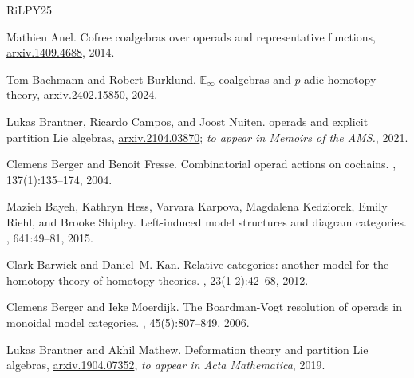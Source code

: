 \documentclass[a4paper,12pt]{amsart}
\theoremstyle{plain}
\theoremstyle{definition}
\theoremstyle{remark}
\begin{document}
\newcommand{\etalchar}[1]{$^{#1}$}
\def\cprime{$'$}
\begin{thebibliography}{RiLPY25}

Mathieu Anel.
\newblock Cofree coalgebras over operads and representative functions,
  \href{https://arxiv.org/abs/1409.4688}{arxiv.1409.4688}, 2014.

Tom Bachmann and Robert Burklund.
\newblock $\mathbb{E}_{\infty}$-coalgebras and $p$-adic homotopy theory,
  \href{https://arxiv.org/abs/2402.15850}{arxiv.2402.15850}, 2024.

Lukas Brantner, Ricardo Campos, and Joost Nuiten.
 operads and explicit partition {L}ie algebras,
  \href{https://arxiv.org/abs/2104.03870}{arxiv.2104.03870}; \textit{ to appear
  in Memoirs of the AMS.}, 2021.

Clemens Berger and Benoit Fresse.
\newblock Combinatorial operad actions on cochains.
, 137(1):135--174, 2004.

\bibitem[BHK{\etalchar{+}}15]{BHKKRS}
Mazieh Bayeh, Kathryn Hess, Varvara Karpova, Magdalena Kedziorek, Emily Riehl,
  and Brooke Shipley.
\newblock Left-induced model structures and diagram categories.
, 641:49--81, 2015.

Clark Barwick and Daniel~M. Kan.
\newblock Relative categories: another model for the homotopy theory of
  homotopy theories.
, 23(1-2):42--68, 2012.

Clemens Berger and Ieke Moerdijk.
\newblock The {Boardman}-{Vogt} resolution of operads in monoidal model
  categories.
, 45(5):807--849, 2006.

Lukas Brantner and Akhil Mathew.
\newblock Deformation theory and partition {L}ie algebras,
  \href{https://arxiv.org/abs/1904.07352}{arxiv.1904.07352}, \textit{to appear
  in Acta Mathematica}, 2019.



\end{thebibliography}
\end{document}
